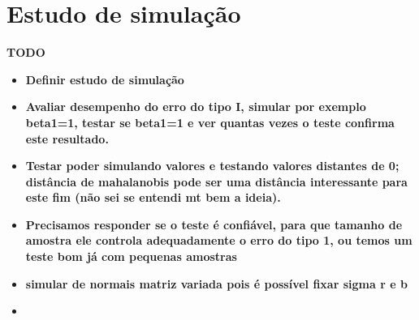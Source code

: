 \chapter{Estudo de simulação}


\textbf{TODO}

\begin{itemize}
  
  \item \textbf{Definir estudo de simulação}
  
  \item \textbf{Avaliar desempenho do erro do tipo I, simular por exemplo beta1=1, testar se beta1=1 e ver quantas vezes o teste confirma este resultado. }
  
  \item \textbf{Testar poder simulando valores e testando valores distantes de 0; distância de mahalanobis pode ser uma distância interessante para este fim (não sei se entendi mt bem a ideia).}
  
  \item \textbf{Precisamos responder se o teste é confiável, para que tamanho de amostra ele controla adequadamente o erro do tipo 1, ou temos um teste bom já com pequenas amostras}
  
  \item \textbf{simular de normais matriz variada pois é possível fixar sigma r e b}
  
  \item \textbf{}
  
\end{itemize}


